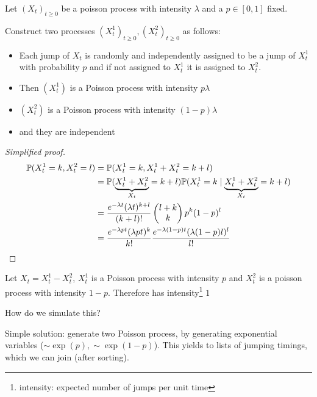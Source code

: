 \begin{lemma}\label{lem:4.9}
    Let $(X_t)_{t\geq 0}$ be a poisson process with intensity $\lambda$ and a $p\in [0,1]$ fixed.

    Construct two processes $(X_t^1)_{t\geq 0},(X_t^2)_{t\geq 0}$ as follows:
    \begin{itemize}
        \item Each jump of $X_t$ is randomly and independently assigned to be a jump of $X_t^1$ with probability $p$ and if not assigned to $X_t^1$ it is assigned to $X_t^2$.
        \item Then $(X_t^1)$ is a Poisson process with intensity $p\lambda$
        \item $(X_t^2)$ is a Poisson process with intensity $(1-p)\lambda$
        \item and they are independent
    \end{itemize}
\end{lemma}

\begin{proof}[Simplified proof]
    \begin{align*}
        \mathbb{P}(X_t^1=k,X_t^2=l)&=\mathbb{P}(X_t^1=k,X_t^1+X_t^2=k+l)\\
        &=\mathbb{P}(\underbrace{X_t^1+ X_t^2}_{X_t}=k+l)\mathbb{P}(X_t^1=k\mid \underbrace{X_t^1+ X_t^2}_{X_t}=k+l)\\
        &=\frac{e^{-\lambda t}(\lambda t)^{k+l}}{(k+l)!}\begin{pmatrix}
            l+k\\k
        \end{pmatrix}p^k (1-p)^l\\
        &=\frac{e^{-\lambda p t}(\lambda p t)^k}{k!}\frac{e^{-\lambda(1-p)t}(\lambda (1-p)l)^l}{l!}\qedhere
    \end{align*}
\end{proof}

\begin{aremark}
    Let $X_t=X_t^1-X_t^2$, $X_t^1$ is a Poisson process with intensity $p$ and $X_t^2$ is a poisson process with intensity $1-p$. Therefore 
    has intensity\footnote{intensity: expected number of jumps per unit time} $1$    
\end{aremark}

How do we simulate this?

Simple solution: generate two Poisson process, by generating exponential variables ($\sim \exp(p),\sim\exp(1-p)$). This yields to lists of jumping timings, which we can join (after sorting).

